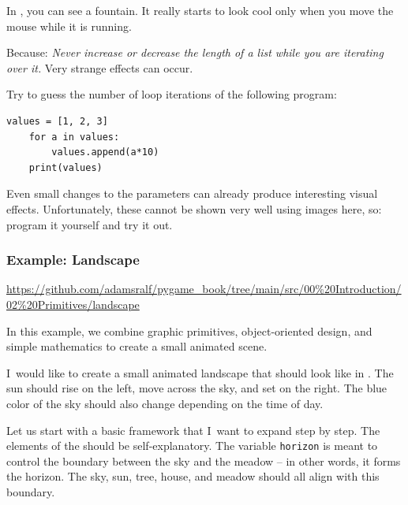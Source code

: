 In , you can see a fountain. It really starts to look cool only when you move the mouse while it is running.


\begin{warningbox}
	Because: \emph{Never increase or decrease the length of a list while you are iterating over it.} Very strange effects can occur. 
\end{warningbox}

Try to guess the number of loop iterations of the following program:	
\begin{lstlisting}[firstnumber=1]
	values = [1, 2, 3]
	for a in values:
		values.append(a*10)
	print(values)	
\end{lstlisting}

Even small changes to the parameters can already produce interesting visual effects.
Unfortunately, these cannot be shown very well using images here, so: program it yourself and try it out.


\subsubsection{Example: Landscape}\label{secLandscape}
\begin{diskbox}
	\url{https://github.com/adamsralf/pygame_book/tree/main/src/00%20Introduction/02%20Primitives/landscape}
\end{diskbox}

In this example, we combine graphic primitives, object-oriented design, and simple mathematics to create a small animated scene.


I~would like to create a small animated landscape that should look like in . The sun should rise on the left, move across the sky, and set on the right. The blue color of the sky should also change depending on the time of day.

Let us start with a basic framework that I~want to expand step by step. The elements of the  should be self-explanatory. The variable \texttt{horizon} is meant to control the boundary between the sky and the meadow -- in other words, it forms the horizon. The sky, sun, tree, house, and meadow should all align with this
boundary.

